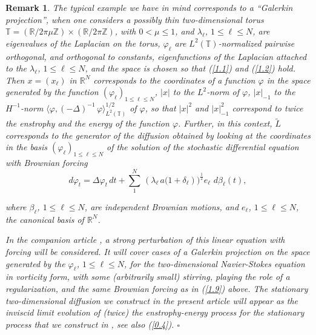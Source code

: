 \documentclass[12pt,leqno]{article}
\def\IR{{\mathbb R}}
\def\IT{{\mathbb T}}
\def\IZ{{\mathbb Z}}
\def\n{\noindent}
\def\wt{\widetilde}
\newtheorem{remark}[theorem]{Remark}
\begin{document}
\begin{remark}\label{rem1.1}
\rm The typical example we have in mind corresponds to a ``Galerkin projection'', when one considers a possibly thin two-dimensional torus $\IT = (\IR / 2 \pi \mu \IZ) \times (\IR / 2 \pi \IZ)$, with $0 < \mu \le 1$, and $\lambda_\ell$, $1 \le \ell \le N$, are eigenvalues of the Laplacian on the torus, $\varphi_\ell$ are $L^2(\IT)$-normalized pairwise orthogonal, and orthogonal to constants, eigenfunctions of the Laplacian attached to the $\lambda_\ell$, $1\le \ell \le N$, and the space is chosen so that (\ref{1.1}) and (\ref{1.2}) hold. Then $x = (x_\ell)$ in $\IR^N$ corresponds to the coordinates of a function $\varphi$ in the space generated by the function $(\varphi_\ell)_{1 \le \ell \le N}$, $|x|$ to the $L^2$-norm of $\varphi$, $|x|_{-1}$ to the $H^{-1}$-norm $\langle \varphi, (-\Delta)^{-1} \,\varphi \rangle^{1/2}_{L^2(\IT)}$ of $\varphi$, so that $|x|^2$ and $|x|^2_{-1}$ correspond to twice the enstrophy and the energy of the function $\varphi$. Further, in this context, $\wt{L}$ corresponds to the generator of the diffusion obtained by looking at the coordinates in the basis $(\varphi_\ell)_{1 \le \ell \le N}$ of the solution of the stochastic differential equation with Brownian forcing
\begin{equation}\label{1.9}
d \varphi_t = \Delta \varphi_t \, dt + \sum_1^N \,(\lambda_\ell \, a\big(1 + \delta_\ell)\big)^{\frac{1}{2}} e_\ell \,\,d \beta_\ell(t),
\end{equation}

\n
where $\beta_\ell$, $1 \le \ell \le N$, are independent Brownian motions, and $e_\ell$, $1 \le \ell \le N$, the canonical basis of $\IR^N$.

\medskip
In the companion article \cite{SzniWidm26b}, a strong perturbation of this linear equation with forcing will be considered. It will cover cases of a Galerkin projection on the space generated by the $\varphi_\ell$, $1 \le \ell \le N$, for the two-dimensional Navier-Stokes equation in vorticity form, with some (arbitrarily small) stirring, playing the role of a regularization, and the same Brownian forcing as in (\ref{1.9}) above. The stationary two-dimensional diffusion we construct in the present article will appear as the inviscid limit evolution of (twice) the enstrophy-energy process for the stationary process that we construct in \cite{SzniWidm26b}, see also (\ref{0.4}). \hfill $\square$
\end{remark}
\end{document}
